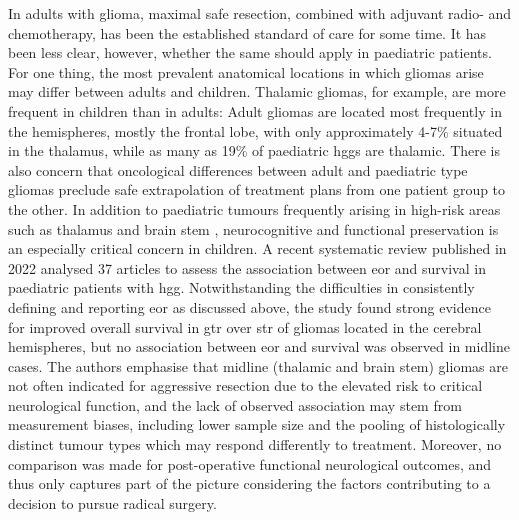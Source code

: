 In adults with glioma, maximal safe resection, combined with adjuvant radio- and chemotherapy, has been the established standard of care for some time.
It has been less clear, however, whether the same should apply in paediatric patients.
For one thing, the most prevalent anatomical locations in which gliomas arise may differ between adults and children\autocite{Duffau2004}.
Thalamic gliomas, for example, are more frequent in children than in adults\autocite{Cinalli2018,Palmisciano2021,GomezVecchio2021}:
Adult gliomas are located most frequently in the hemispheres, mostly the frontal lobe, with only approximately 4-7\%\autocite{GomezVecchio2021,Larjavaara2007} situated in the thalamus, while as many as 19\% of paediatric \glspl{hgg} are thalamic\autocite{McCrea2015}.
There is also concern that oncological differences between adult and paediatric type gliomas preclude safe extrapolation of treatment plans from one patient group to the other\autocite{Jones2012,Greuter2021}.
In addition to paediatric tumours frequently arising in high-risk areas such as thalamus and brain stem \autocite{Ostrom2015},  neurocognitive and functional preservation is an especially critical concern in children.
A recent systematic review published in 2022 analysed 37 articles to assess the association between \gls{eor} and survival in paediatric patients with \gls{hgg}\autocite{Hatoum2022}.
Notwithstanding the difficulties in consistently defining and reporting \gls{eor} as discussed above, the study found strong evidence for improved overall survival in \gls{gtr} over \gls{str} of gliomas located in the cerebral hemispheres, but no association between \gls{eor} and survival was observed in midline cases.
The authors emphasise that midline (thalamic and brain stem) gliomas are not often indicated for aggressive resection due to the elevated risk to critical neurological function, and the lack of observed association may stem from measurement biases, including lower sample size and the pooling of histologically distinct tumour types which may respond differently to treatment.
Moreover, no comparison was made for post-operative functional neurological outcomes, and thus only captures part of the picture considering the factors contributing to a decision to pursue radical surgery.

